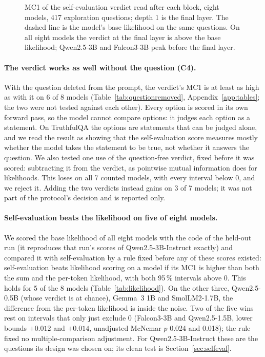 \documentclass[11pt]{article}
\newcommand{\cha}[1]{\textsf{C#1}}
\newcommand{\mainmodel}{Qwen2.5-3B-Instruct}
\begin{document}
\begin{figure}[t]
\centering

\caption{MC1 of the self-evaluation verdict read after each block, eight models, 417 exploration questions; depth 1
is the final layer. The dashed line is the model's base likelihood on the same questions. On all eight models
the verdict at the final layer is above the base likelihood; Qwen2.5-3B and Falcon3-3B peak before the final layer.}
\label{fig:earlyexit}
\end{figure}

\paragraph{The verdict works as well without the question (\cha4).}
With the question deleted from the prompt, the verdict's MC1 is at least as high as with it on 6 of 8 models
(Table~\ref{tab:questionremoved}, Appendix~\ref{app:tables}; the two were not tested against each other). Every option is scored in its own
forward pass, so the model cannot compare options: it judges each option as a statement. On TruthfulQA the options
are statements that can be judged alone, and we read the result as showing that the self-evaluation score measures
mostly whether the model takes the statement to be true, not whether it answers the question. We also
tested one use of the question-free verdict, fixed before it was scored: subtracting it from the verdict, as
pointwise mutual information does for likelihoods. This loses on all 7 counted models, with every interval below 0,
and we reject it. Adding the two verdicts instead gains on 3 of 7 models; it was not part of the protocol's
decision and is reported only.

\paragraph{Self-evaluation beats the likelihood on five of eight models.}
We scored the base likelihood of all eight models with the code of the held-out run (it reproduces that run's
scores of \mainmodel{} exactly) and compared it with self-evaluation by a rule fixed before any of these scores
existed: self-evaluation beats likelihood scoring on a model if its MC1 is higher than both the sum and the
per-token likelihood, with both 95\,\% intervals above 0. This holds for 5 of the 8 models (Table~\ref{tab:likelihood}).
On the other three, Qwen2.5-0.5B (whose verdict is at chance), Gemma~3 1B and SmolLM2-1.7B, the difference from the
per-token likelihood is inside the noise. Two of the five wins rest on intervals that only just exclude 0
(Falcon3-3B and Qwen2.5-1.5B, lower bounds $+0.012$ and $+0.014$, unadjusted McNemar $p$ 0.024 and 0.018); the rule
fixed no multiple-comparison adjustment. For \mainmodel{} these are the questions its design was chosen on; its
clean test is Section~\ref{sec:selfeval}.
\end{document}
